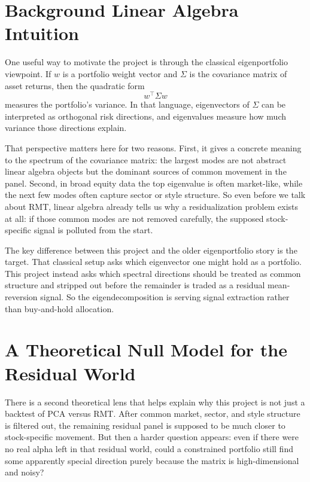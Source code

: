 \documentclass[11pt]{article}
\begin{document}
\section*{Background Linear Algebra Intuition}

One useful way to motivate the project is through the classical
eigenportfolio viewpoint. If \(w\) is a portfolio weight vector and
\(\Sigma\) is the covariance matrix of asset returns, then the quadratic form
\[
w^\top \Sigma w
\]
measures the portfolio's variance. In that language, eigenvectors of
\(\Sigma\) can be interpreted as orthogonal risk directions, and eigenvalues
measure how much variance those directions explain.

That perspective matters here for two reasons. First, it gives a concrete
meaning to the spectrum of the covariance matrix: the largest modes are not
abstract linear algebra objects but the dominant sources of common movement in
the panel. Second, in broad equity data the top eigenvalue is often
market-like, while the next few modes often capture sector or style structure.
So even before we talk about RMT, linear algebra already tells us why a
residualization problem exists at all: if those common modes are not removed
carefully, the supposed stock-specific signal is polluted from the start.

The key difference between this project and the older eigenportfolio story is
the target. That classical setup asks which eigenvector one might hold as a
portfolio. This project instead asks which spectral directions should be
treated as common structure and stripped out before the remainder is traded as
a residual mean-reversion signal. So the eigendecomposition is serving signal
extraction rather than buy-and-hold allocation.

\section*{A Theoretical Null Model for the Residual World}

There is a second theoretical lens that helps explain why this project is not
just a backtest of PCA versus RMT. After common market, sector, and style
structure is filtered out, the remaining residual panel is supposed to be much
closer to stock-specific movement. But then a harder question appears: even if
there were no real alpha left in that residual world, could a constrained
portfolio still find some apparently special direction purely because the
matrix is high-dimensional and noisy?
\end{document}
